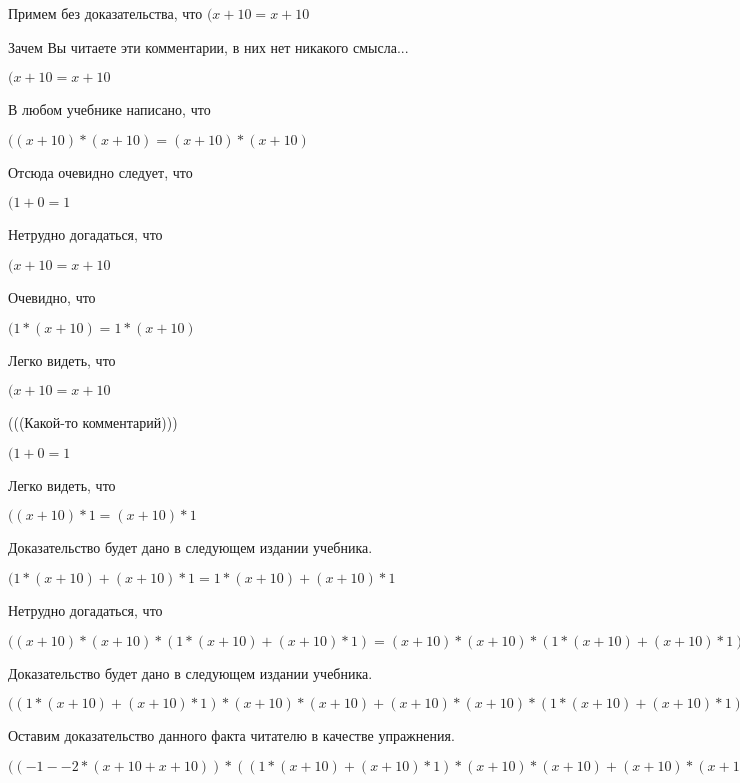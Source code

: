 \documentclass[12pt,a4paper,fleqn]{article}
\theoremstyle{definition}
\begin{document}
Примем без доказательства, что
$( x  +  10  =  x  +  10 $

Зачем Вы читаете эти комментарии, в них нет никакого смысла...

$( x  +  10  =  x  +  10 $

В любом учебнике написано, что

$(( x  +  10 ) * ( x  +  10 ) = ( x  +  10 ) * ( x  +  10 )$

Отсюда очевидно следует, что

$( 1  +  0  =  1 $

Нетрудно догадаться, что

$( x  +  10  =  x  +  10 $

Очевидно, что

$( 1  * ( x  +  10 ) =  1  * ( x  +  10 )$

Легко видеть, что

$( x  +  10  =  x  +  10 $

(((Какой-то комментарий)))

$( 1  +  0  =  1 $

Легко видеть, что

$(( x  +  10 ) *  1  = ( x  +  10 ) *  1 $

Доказательство будет дано в следующем издании учебника.

$( 1  * ( x  +  10 ) + ( x  +  10 ) *  1  =  1  * ( x  +  10 ) + ( x  +  10 ) *  1 $

Нетрудно догадаться, что

$(( x  +  10 ) * ( x  +  10 ) * ( 1  * ( x  +  10 ) + ( x  +  10 ) *  1 ) = ( x  +  10 ) * ( x  +  10 ) * ( 1  * ( x  +  10 ) + ( x  +  10 ) *  1 )$

Доказательство будет дано в следующем издании учебника.

$(( 1  * ( x  +  10 ) + ( x  +  10 ) *  1 ) * ( x  +  10 ) * ( x  +  10 ) + ( x  +  10 ) * ( x  +  10 ) * ( 1  * ( x  +  10 ) + ( x  +  10 ) *  1 ) = ( 1  * ( x  +  10 ) + ( x  +  10 ) *  1 ) * ( x  +  10 ) * ( x  +  10 ) + ( x  +  10 ) * ( x  +  10 ) * ( 1  * ( x  +  10 ) + ( x  +  10 ) *  1 )$

Оставим доказательство данного факта читателю в качестве упражнения.

$(( -1  -  -2  * ( x  +  10  +  x  +  10 )) * (( 1  * ( x  +  10 ) + ( x  +  10 ) *  1 ) * ( x  +  10 ) * ( x  +  10 ) + ( x  +  10 ) * ( x  +  10 ) * ( 1  * ( x  +  10 ) + ( x  +  10 ) *  1 )) = ( -1  -  -2  * ( x  +  10  +  x  +  10 )) * (( 1  * ( x  +  10 ) + ( x  +  10 ) *  1 ) * ( x  +  10 ) * ( x  +  10 ) + ( x  +  10 ) * ( x  +  10 ) * ( 1  * ( x  +  10 ) + ( x  +  10 ) *  1 ))$
\end{document}
